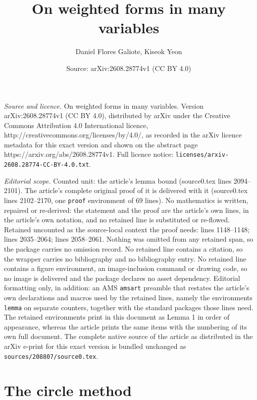 \documentclass[10pt,a4paper]{amsart}
\title{On weighted forms in many variables}
\author{Daniel Flores Galiote, Kiseok Yeon}
\date{Source: arXiv:2608.28774v1 (CC BY 4.0)}
\begin{document}
\maketitle

\noindent\emph{Source and licence.} On weighted forms in many variables. Version arXiv:2608.28774v1 (CC BY 4.0), distributed by arXiv under the Creative Commons Attribution 4.0 International licence, http://creativecommons.org/licenses/by/4.0/, as recorded in the arXiv licence metadata for this exact version and shown on the abstract page https://arxiv.org/abs/2608.28774v1. Full licence notice: \texttt{licenses/arxiv-2608.28774-CC-BY-4.0.txt}.\par\smallskip

\noindent\textit{Editorial scope.} Counted unit: the article's lemma bound (source0.tex lines 2094--2101). The article's complete original proof of it is delivered with it (source0.tex lines 2102--2170, one \texttt{proof} environment of 69 lines). No mathematics is written, repaired or re-derived: the statement and the proof are the article's own lines, in the article's own notation, and no retained line is substituted or re-flowed.  Retained uncounted as the source-local context the proof needs: lines 1148--1148; lines 2035--2064; lines 2058--2061.  Nothing was omitted from any retained span, so the package carries no omission record.  No retained line contains a citation, so the wrapper carries no bibliography and no bibliography entry.  No retained line contains a figure environment, an image-inclusion command or drawing code, so no image is delivered and the package declares no asset dependency.  Editorial formatting only, in addition: an AMS \texttt{amsart} preamble that restates the article's own declarations and macros used by the retained lines, namely the environments \texttt{lemma} on separate counters, together with the standard packages those lines need.  The retained environments print in this document as Lemma 1 in order of appearance, whereas the article prints the same items with the numbering of its own full document.  The complete native source of the article as distributed in the arXiv e-print for this exact version is bundled unchanged as \texttt{sources/208807/source0.tex}.
\section{The circle method}\label{sec:circle method}
\end{document}
